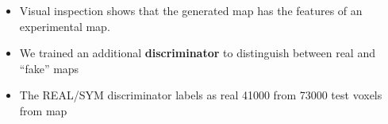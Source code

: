 \begin{itemize}
	\item Visual inspection shows that the generated map has the features of an  experimental map.
	\item We trained an additional \textbf{ discriminator}  to distinguish between real and “fake” maps
	\item The REAL/SYM discriminator labels as real 41000 from 73000 test voxels from map

\end{itemize}